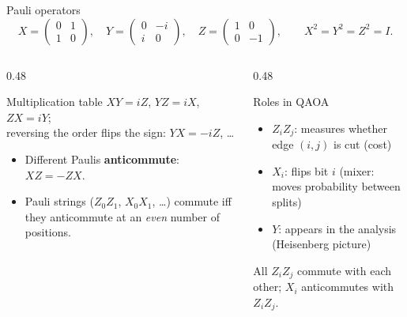 \documentclass[aspectratio=169,11pt]{beamer}
\newcommand{\key}[1]{{\color{qdark}\textbf{#1}}}
\begin{document}
\begin{frame}{Pauli operators}
  \[ X = \begin{pmatrix}0&1\\1&0\end{pmatrix}, \quad Y = \begin{pmatrix}0&-i\\i&0\end{pmatrix}, \quad
     Z = \begin{pmatrix}1&0\\0&-1\end{pmatrix}, \qquad X^2 = Y^2 = Z^2 = I . \]
  \begin{columns}[T]
    \begin{column}{0.48\textwidth}
      \begin{block}{Multiplication table}
        $XY = iZ$, $YZ = iX$, $ZX = iY$;\\ reversing the order flips the sign: $YX = -iZ$, \dots
      \end{block}
      \begin{itemize}
        \item Different Paulis \key{anticommute}: $XZ = -ZX$.
        \item Pauli strings ($Z_0Z_1$, $X_0X_1$, \dots) commute iff they anticommute at an \emph{even} number of positions.
      \end{itemize}
    \end{column}
    \begin{column}{0.48\textwidth}
      \begin{block}{Roles in QAOA}
        \begin{itemize}
          \item $Z_iZ_j$: measures whether edge $(i,j)$ is cut (cost)
          \item $X_i$: flips bit $i$ (mixer: moves probability between splits)
          \item $Y$: appears in the analysis (Heisenberg picture)
        \end{itemize}
      \end{block}
      \small All $Z_iZ_j$ commute with each other; $X_i$ anticommutes with $Z_iZ_j$.
    \end{column}
  \end{columns}
\end{frame}
\end{document}
